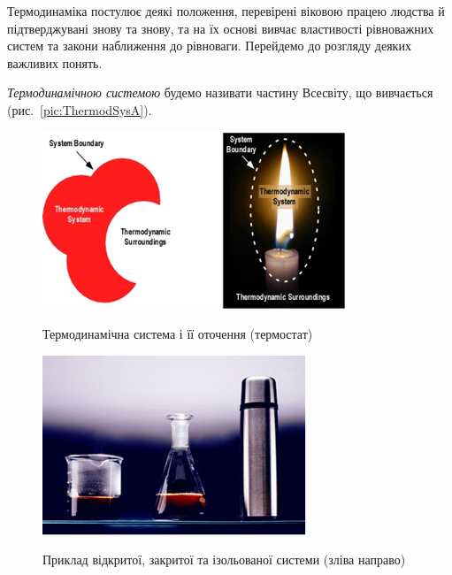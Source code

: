 Термодинаміка постулює деякі положення, перевірені віковою працею людства й підтверджувані знову та знову, та на їх основі вивчає властивості рівноважних систем та закони наближення до рівноваги. Перейдемо до розгляду деяких важливих понять.

\emph{Термодинамічною системою} будемо називати частину Всесвіту, що вивчається (рис.~\ref{pic:ThermodSysA}).

\begin{figure}[h!]\centering
    \begin{subcaptionblock}{0.45\linewidth}\centering
        \includegraphics[width=\linewidth]{Lec1/ThermodSysA}
        \caption{Термодинамічна система і її оточення (термостат)}\label{pic:ThermodSysA}
    \end{subcaptionblock}
\quad%
    \begin{subcaptionblock}{0.45\linewidth}\centering
        \includegraphics[width=\linewidth]{Lec1/ThermodSysB}
        \caption{Приклад відкритої, закритої та ізольованої системи (зліва направо)}\label{pic:ThermodSysB}
    \end{subcaptionblock}
\caption{}
\end{figure}

